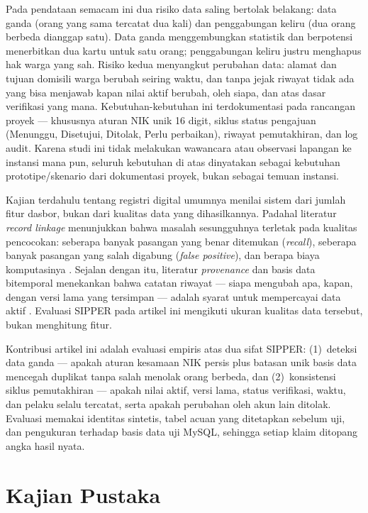\documentclass[11pt,a4paper]{article}
\begin{document}
Pada pendataan semacam ini dua risiko data saling bertolak belakang: data ganda (orang yang sama tercatat dua kali) dan penggabungan keliru (dua orang berbeda dianggap satu). Data ganda menggembungkan statistik dan berpotensi menerbitkan dua kartu untuk satu orang; penggabungan keliru justru menghapus hak warga yang sah. Risiko kedua menyangkut perubahan data: alamat dan tujuan domisili warga berubah seiring waktu, dan tanpa jejak riwayat tidak ada yang bisa menjawab kapan nilai aktif berubah, oleh siapa, dan atas dasar verifikasi yang mana. Kebutuhan-kebutuhan ini terdokumentasi pada rancangan proyek --- khususnya aturan NIK unik 16 digit, siklus status pengajuan (Menunggu, Disetujui, Ditolak, Perlu perbaikan), riwayat pemutakhiran, dan log audit. Karena studi ini tidak melakukan wawancara atau observasi lapangan ke instansi mana pun, seluruh kebutuhan di atas dinyatakan sebagai kebutuhan prototipe/skenario dari dokumentasi proyek, bukan sebagai temuan instansi.

Kajian terdahulu tentang registri digital umumnya menilai sistem dari jumlah fitur dasbor, bukan dari kualitas data yang dihasilkannya. Padahal literatur \emph{record linkage} menunjukkan bahwa masalah sesungguhnya terletak pada kualitas pencocokan: seberapa banyak pasangan yang benar ditemukan (\emph{recall}), seberapa banyak pasangan yang salah digabung (\emph{false positive}), dan berapa biaya komputasinya \cite{christen2012,christen2007}. Sejalan dengan itu, literatur \emph{provenance} dan basis data bitemporal menekankan bahwa catatan riwayat --- siapa mengubah apa, kapan, dengan versi lama yang tersimpan --- adalah syarat untuk mempercayai data aktif \cite{simmhan2005,neelamegam2026}. Evaluasi SIPPER pada artikel ini mengikuti ukuran kualitas data tersebut, bukan menghitung fitur.

Kontribusi artikel ini adalah evaluasi empiris atas dua sifat SIPPER: (1)~deteksi data ganda --- apakah aturan kesamaan NIK persis plus batasan unik basis data mencegah duplikat tanpa salah menolak orang berbeda, dan (2)~konsistensi siklus pemutakhiran --- apakah nilai aktif, versi lama, status verifikasi, waktu, dan pelaku selalu tercatat, serta apakah perubahan oleh akun lain ditolak. Evaluasi memakai identitas sintetis, tabel acuan yang ditetapkan sebelum uji, dan pengukuran terhadap basis data uji MySQL, sehingga setiap klaim ditopang angka hasil nyata.

\section{Kajian Pustaka}
\end{document}
